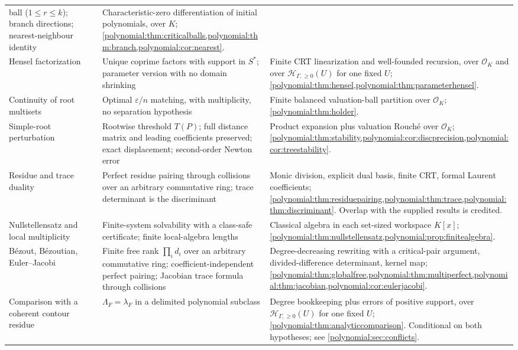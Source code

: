 \documentclass[11pt,letterpaper]{article}
\numberwithin{equation}{section}
\theoremstyle{definition}
\theoremstyle{remark}\newtheorem{remark}[theorem]{Remark}
\newcommand{\OO}{\mathcal O}
\newcommand{\HHn}{\mathscr H_{\Gamma,\ge0}}
\begin{document}
\begin{longtable}{@{}P{0.24\textwidth}P{0.31\textwidth}P{0.36\textwidth}@{}}
ball ($1\le r\le k$); branch directions; nearest-neighbour identity &
Characteristic-zero differentiation of initial polynomials, over $K$;
\cref{polynomial:thm:criticalballs,polynomial:thm:branch,polynomial:cor:nearest}.\\[0.4em]
Hensel factorization & Unique coprime factors with support in $S^*$; parameter
version with no domain shrinking & Finite CRT linearization and well-founded
recursion, over $\OO_K$ and over $\HHn(U)$ for one fixed $U$;
\cref{polynomial:thm:hensel,polynomial:thm:parameterhensel}.\\[0.4em]
Continuity of root multisets & Optimal $\varepsilon/n$ matching, with
multiplicity, no separation hypothesis & Finite balanced valuation-ball
partition over $\OO_K$; \cref{polynomial:thm:holder}.\\[0.4em]
Simple-root perturbation & Rootwise threshold $T(P)$; full distance matrix and
leading coefficients preserved; exact displacement; second-order Newton error
& Product expansion plus valuation Rouch\'e over $\OO_K$;
\cref{polynomial:thm:stability,polynomial:cor:discprecision,polynomial:cor:treestability}.\\[0.4em]
Residue and trace duality & Perfect residue pairing through collisions over an
arbitrary commutative ring; trace determinant is the discriminant & Monic
division, explicit dual basis, finite CRT, formal Laurent coefficients;
\cref{polynomial:thm:residuepairing,polynomial:thm:trace,polynomial:thm:discriminant}.
Overlap with the supplied results is credited.\\[0.4em]
Nullstellensatz and local multiplicity & Finite-system solvability with a
class-safe certificate; finite local-algebra lengths & Classical algebra in
each set-sized workspace $K[x]$;
\cref{polynomial:thm:nullstellensatz,polynomial:prop:finitealgebra}.\\[0.4em]
B\'ezout, B\'ezoutian, Euler--Jacobi & Finite free rank $\prod_id_i$ over an
arbitrary commutative ring; coefficient-independent perfect pairing; Jacobian
trace formula through collisions & Degree-decreasing rewriting with a
critical-pair argument, divided-difference determinant, kernel map;
\cref{polynomial:thm:globalfree,polynomial:thm:multiperfect,polynomial:thm:jacobian,polynomial:cor:eulerjacobi}.\\[0.4em]
Comparison with a coherent contour residue & $\Lambda_F=\lambda_F$ in a
delimited polynomial subclass & Degree bookkeeping plus errors of positive
support, over $\HHn(U)$ for one fixed $U$; \cref{polynomial:thm:analyticcomparison}.
Conditional on both hypotheses; see \cref{polynomial:sec:conflicts}.\\
\bottomrule
\end{longtable}
\end{document}

